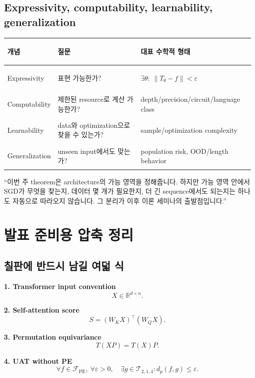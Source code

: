 \documentclass[11pt,a4paper,oneside,openany]{memoir}
\newcommand{\R}{\mathbb{R}}
\newcommand{\norm}[1]{\left\lVert #1\right\rVert}
\theoremstyle{definition}
\begin{document}
\section{Expressivity, computability, learnability, generalization}

\begin{center}
\small
\begin{tabularx}{\textwidth}{>{\bfseries\raggedright\arraybackslash}p{}Y Y}
\toprule
개념 & 질문 & 대표 수학적 형태 \\
\midrule
Expressivity & 표현 가능한가? & $\exists\theta:\ \norm{T_\theta-f}<\varepsilon$ \\
Computability & 제한된 resource로 계산 가능한가? & depth/precision/circuit/language class \\
Learnability & data와 optimization으로 찾을 수 있는가? & sample/optimization complexity \\
Generalization & unseen input에서도 맞는가? & population risk, OOD/length behavior \\
\bottomrule
\end{tabularx}
\end{center}

\begin{presentbox}
``이번 주 theorem은 architecture의 가능 영역을 정해줍니다. 하지만 가능 영역 안에서 SGD가 무엇을 찾는지, 데이터 몇 개가 필요한지, 더 긴 sequence에서도 되는지는 하나도 자동으로 따라오지 않습니다. 그 분리가 이후 이론 세미나의 출발점입니다.''
\end{presentbox}

\chapter{발표 준비용 압축 정리}

\section{칠판에 반드시 남길 여덟 식}

\textbf{1. Transformer input convention}
\[
X\in\R^{d\times n}.
\]

\textbf{2. Self-attention score}
\[
S=(W_KX)^\top(W_QX).
\]

\textbf{3. Permutation equivariance}
\[
T(XP)=T(X)P.
\]

\textbf{4. UAT without PE}
\[
\forall f\in\mathcal F_{\mathrm{PE}},\ \forall\varepsilon>0,
\quad
\exists g\in\mathcal T_{2,1,4}:
 d_p(f,g)\le\varepsilon.
\]
\end{document}
